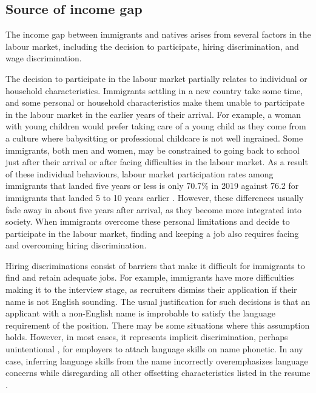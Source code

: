 \subsection{Source of income gap}

The income gap between immigrants and natives arises from several factors in the labour market, including the decision to participate, hiring discrimination, and wage discrimination.

\vspace{0.7em}\par
The decision to participate in the labour market partially relates to individual or household characteristics.
Immigrants settling in a new country take some time, and some personal or household characteristics make them unable to participate in the labour market in the earlier years of their arrival.
For example, a woman with young children would prefer taking care of a young child as they come from a culture where babysitting or professional childcare is not well ingrained.
Some immigrants, both men and women, may be constrained to going back to school just after their arrival or after facing difficulties in the labour market.
As a result of these individual behaviours, labour market participation rates among immigrants that landed five years or less is only 70.7\% in 2019 against 76.2 for immigrants that landed 5 to 10 years earlier \citep{statCan:002}.
However, these differences usually fade away in about five years after arrival, as they become more integrated into society.
When immigrants overcome these personal limitations and decide to participate in the labour market, finding and keeping a job also requires facing and overcoming hiring discrimination.

\vspace{0.7em}\par
Hiring discriminations consist of barriers that make it difficult for immigrants to find and retain adequate jobs.
For example, immigrants have more difficulties making it to the interview stage, as recruiters dismiss their application if their name is not English sounding.
The usual justification for such decisions is that an applicant with a non-English name is improbable to satisfy the language requirement of the position.
There may be some situations where this assumption holds.
However, in most cases, it represents implicit discrimination, perhaps unintentional \citep{Crandall:wo,ROOTH2010523}, for employers to attach language skills on name phonetic.
In any case, inferring language skills from the name incorrectly overemphasizes language concerns while disregarding all other offsetting characteristics listed in the resume \citep{Oreopoulos:2011jv}.

